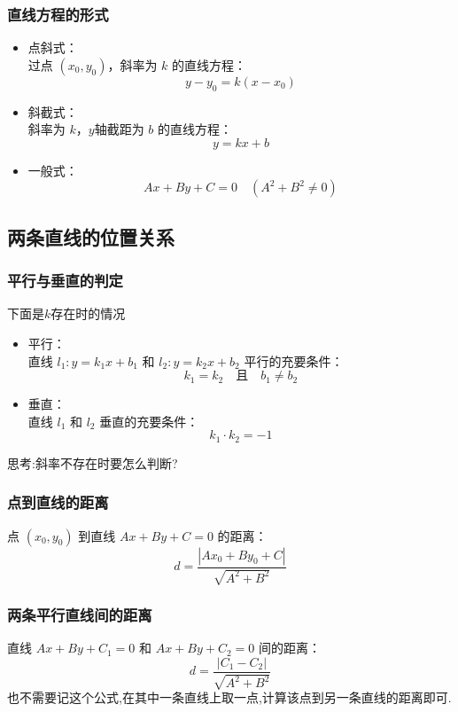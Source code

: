 \documentclass{article}
\begin{document}
\subsubsection{直线方程的形式}
\begin{itemize}
    \item 点斜式：\\
          过点 \( (x_0, y_0) \)，斜率为 \( k \) 的直线方程：
          \[
          y - y_0 = k(x - x_0)
          \]
          
    \item 斜截式：\\
          斜率为 \( k \)，$y$轴截距为 \( b \) 的直线方程：
          \[
          y = kx + b
          \]

          

    \item 一般式：
          \[
          Ax + By + C = 0 \quad (A^2 + B^2 \neq 0)
          \]
\end{itemize}

\subsection{两条直线的位置关系}
\subsubsection{平行与垂直的判定}
下面是$k$存在时的情况
\begin{itemize}
    \item 平行：\\
          直线 \( l_1: y = k_1x + b_1 \) 和 \( l_2: y = k_2x + b_2 \) 平行的充要条件：
          \[
          k_1 = k_2 \quad \text{且} \quad b_1 \neq b_2
          \]
          
    \item 垂直：\\
          直线 \( l_1 \) 和 \( l_2 \) 垂直的充要条件：
          \[
          k_1 \cdot k_2 = -1
          \]
\end{itemize}
思考:斜率不存在时要怎么判断?


\subsubsection{点到直线的距离}
点 \( (x_0, y_0) \) 到直线 \( Ax + By + C = 0 \) 的距离：
\[
d = \frac{|Ax_0 + By_0 + C|}{\sqrt{A^2 + B^2}}
\]

\subsubsection{两条平行直线间的距离}
直线 \( Ax + By + C_1 = 0 \) 和 \( Ax + By + C_2 = 0 \) 间的距离：
\[
d = \frac{|C_1 - C_2|}{\sqrt{A^2 + B^2}}
\]
也不需要记这个公式,在其中一条直线上取一点,计算该点到另一条直线的距离即可.
\end{document}
